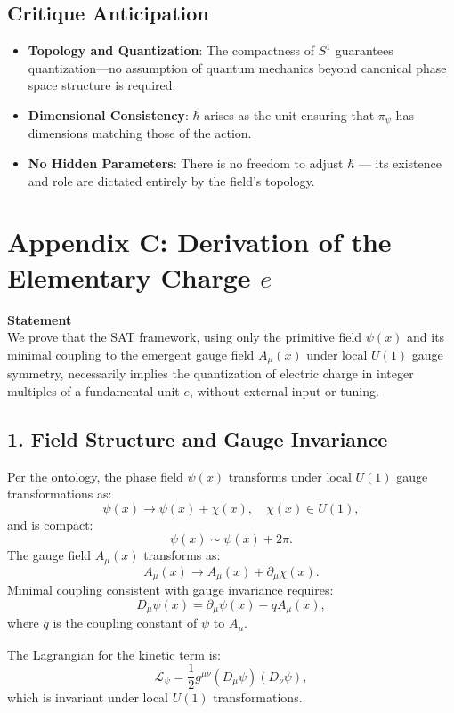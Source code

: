 \documentclass[12pt]{article}
\begin{document}
\subsection*{Critique Anticipation}
\begin{itemize}
    \item \textbf{Topology and Quantization}: The compactness of \(S^1\) guarantees quantization—no assumption of quantum mechanics beyond canonical phase space structure is required.
    \item \textbf{Dimensional Consistency}: \(\hbar\) arises as the unit ensuring that \(\pi_\psi\) has dimensions matching those of the action.
    \item \textbf{No Hidden Parameters}: There is no freedom to adjust \(\hbar\) — its existence and role are dictated entirely by the field’s topology.
\end{itemize}
\newpage

\section*{Appendix C: Derivation of the Elementary Charge \(e\)}

\textbf{Statement} \\
We prove that the SAT framework, using only the primitive field \(\psi(x)\) and its minimal coupling to the emergent gauge field \(A_\mu(x)\) under local \(U(1)\) gauge symmetry, necessarily implies the quantization of electric charge in integer multiples of a fundamental unit \(e\), without external input or tuning.

\subsection*{1. Field Structure and Gauge Invariance}
Per the ontology, the phase field \(\psi(x)\) transforms under local \(U(1)\) gauge transformations as:
\[
\psi(x) \to \psi(x) + \chi(x), \quad \chi(x) \in U(1),
\]
and is compact:
\[
\psi(x) \sim \psi(x) + 2\pi.
\]
The gauge field \(A_\mu(x)\) transforms as:
\[
A_\mu(x) \to A_\mu(x) + \partial_\mu \chi(x).
\]
Minimal coupling consistent with gauge invariance requires:
\[
D_\mu \psi(x) = \partial_\mu \psi(x) - q A_\mu(x),
\]
where \(q\) is the coupling constant of \(\psi\) to \(A_\mu\).

The Lagrangian for the kinetic term is:
\[
\mathcal{L}_\psi = \frac{1}{2} g^{\mu\nu} (D_\mu \psi)(D_\nu \psi),
\]
which is invariant under local \(U(1)\) transformations.
\end{document}
